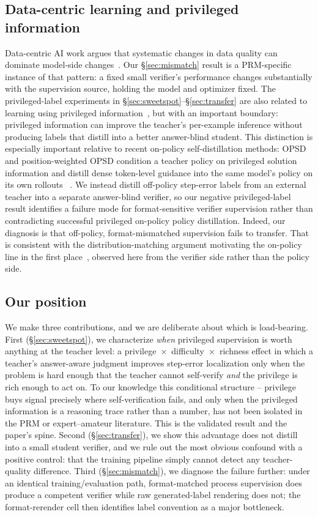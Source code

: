 \documentclass{article}
\begin{document}
\subsection{Data-centric learning and privileged information}
Data-centric AI work argues that systematic changes in data quality can
dominate model-side changes~\cite{mazumder2022dataperf}. Our
\S\ref{sec:mismatch} result is a PRM-specific instance of that pattern: a
fixed small verifier's performance changes substantially with the
supervision source, holding the model and optimizer fixed. The
privileged-label experiments in \S\ref{sec:sweetspot}--\S\ref{sec:transfer}
are also related to learning using privileged
information~\cite{vapnik2009privileged}, but with an important boundary:
privileged information can improve the teacher's per-example inference
without producing labels that distill into a better answer-blind student.
This distinction is especially important relative to recent on-policy
self-distillation methods: OPSD and position-weighted OPSD condition a
teacher policy on privileged solution information and distill dense token-level
guidance into the same model's policy on its own rollouts
~\cite{zhao2026opsd,liu2026pwopsd}. We instead distill off-policy
step-error labels from an external teacher into a separate answer-blind
verifier, so our negative privileged-label result identifies a failure mode for
format-sensitive verifier supervision rather than contradicting successful
privileged on-policy policy distillation. Indeed, our diagnosis is that
off-policy, format-mismatched supervision fails to transfer. That is
consistent with the distribution-matching argument motivating the on-policy
line in the first place~\cite{rethinking2026onpolicy}, observed here from the
verifier side rather than the policy side.

\subsection{Our position}
We make three contributions, and we are deliberate about which is
load-bearing. First (\S\ref{sec:sweetspot}), we characterize \emph{when}
privileged supervision is worth anything at the teacher level: a
privilege~$\times$~difficulty~$\times$~richness effect in which a teacher's
answer-aware judgment improves step-error localization only when the problem
is hard enough that the teacher cannot self-verify \emph{and} the privilege
is rich enough to act on. To our knowledge this conditional structure --
privilege buys signal precisely where self-verification fails, and only when
the privileged information is a reasoning trace rather than a number, has
not been isolated in the PRM or expert--amateur literature. This is the
validated result and the paper's spine. Second (\S\ref{sec:transfer}), we
show this advantage does not distill into a small student verifier, and we
rule out the most obvious confound with a positive control: that the
training pipeline simply cannot detect any teacher-quality difference.
Third (\S\ref{sec:mismatch}), we diagnose the failure further: under an
identical training/evaluation path, format-matched process supervision does
produce a competent verifier while raw generated-label rendering does not; the
format-rerender cell then identifies label convention as a major bottleneck.
\end{document}
